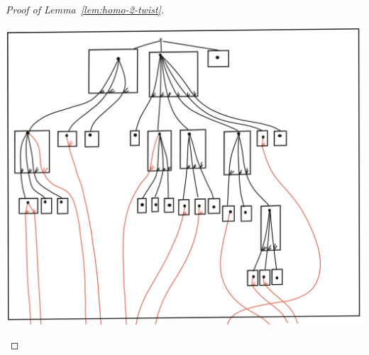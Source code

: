 \begin{proof}[Proof of Lemma~\ref{lem:homo-2-twist}]
\begin{center}
\includegraphics[scale=.07]{MyPic39.jpg}
\end{center} 
\end{proof}

